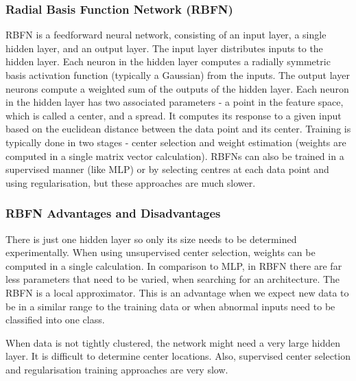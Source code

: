\documentclass[a4paper, 11pt]{article}
\begin{document}
\subsubsection{Radial Basis Function Network (RBFN)}
RBFN is a feedforward neural network, consisting of an input layer, a single hidden layer, and an output layer. The input layer distributes inputs to the hidden layer. Each neuron in the hidden layer computes a radially symmetric basis activation function (typically a Gaussian) from the inputs. The output layer neurons compute a weighted sum of the outputs of the hidden layer. Each neuron in the hidden layer has two associated parameters - a point in the feature space, which is called a center, and a spread. It computes its response to a given input based on the euclidean distance between the data point and its center. Training is typically done in two stages - center selection and weight estimation (weights are computed in a single matrix vector calculation). RBFNs can also be trained in a supervised manner (like MLP) or by selecting centres at each data point and using regularisation, but these approaches are much slower.
\subsubsection{RBFN Advantages and Disadvantages}
There is just one hidden layer so only its size needs to be determined experimentally. When using unsupervised center selection, weights can be computed in a single calculation. In comparison to MLP, in RBFN there are far less parameters that need to be varied, when searching for an architecture. The RBFN is a local approximator. This is an advantage when we expect new data to be in a similar range to the training data or when abnormal inputs need to be classified into one class. 

When data is not tightly clustered, the network might need a very large hidden layer. It is difficult to determine center locations. Also, supervised center selection and regularisation training approaches are very slow. 
\end{document}
